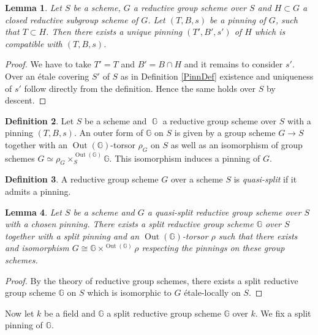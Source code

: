 \documentclass{article}
\newcommand{\Gb}{\mathbb{G}}
\DeclareMathOperator{\G}{\mathbb{G}}
\DeclareMathOperator{\Out}{Out}
\theoremstyle{definition}
\newtheorem{definition}{Definition}[section]
\theoremstyle{plain}
\newtheorem{lemma}[definition]{Lemma}
\begin{document}
\begin{lemma} \label{CompPinn}
    Let $S$ be a scheme, $G$ a reductive group scheme over $S$ and $H \subset G$ a closed reductive subgroup scheme of $G$. Let $(T,B,s)$ be a pinning of $G$, such that $T\subset H$. Then there exists a unique pinning $(T',B',s')$ of $H$ which is compatible with $(T,B,s)$. 
\end{lemma}
\begin{proof}
 We have to take $T'=T$ and $B'=B\cap H$ and it remains to consider $s'$. Over an \'etale covering $S'$ of $S$ as in Definition \ref{PinnDef} existence and uniqueness of $s'$ follow directly from the definition. Hence the same holds over $S$ by descent.
\end{proof}



\begin{definition}
   Let $S$ be a scheme and $\G$ a reductive group scheme over $S$ with a pinning $(T,B,s)$. An outer form of $\Gb$ on $S$ is given by a group scheme $G \to S$ together with an $\Out(\Gb)$-torsor $\rho_G$ on $S$ as well as an isomorphism of group schemes $G \simeq \rho_G \times^{\Out(\Gb)}_S \Gb$. This isomorphism induces a pinning of $G$.
\end{definition}

\begin{definition}
  A reductive group scheme $G$ over a scheme $S$ is \emph{quasi-split} if it admits a pinning.
\end{definition}

\begin{lemma}
  Let $S$ be a scheme and $G$ a quasi-split reductive group scheme over $S$ with a chosen pinning. There exists a split reductive group scheme $\Gb$ over $S$ together with a split pinning and an $\Out(\Gb)$-torsor $\rho$ such that there exists and isomorphism $G \cong \Gb \times^{\Out(\Gb)} \rho$ respecting the pinnings on these group schemes.
\end{lemma}
\begin{proof}
  By the theory of reductive group schemes, there exists a split reductive group scheme $\Gb$ on $S$ which is isomorphic to $G$ \'etale-locally on $S$. 
\end{proof}
Now let $k$ be a field and $\Gb$ a split reductive group scheme $\Gb$ over $k$. We fix a split pinning of $\Gb$.
\end{document}
